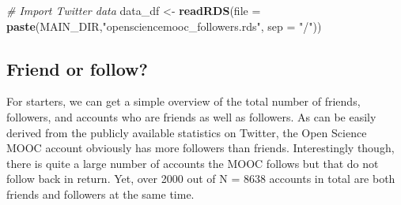 \documentclass[]{article}
\newenvironment{Shaded}{\begin{snugshade}}{\end{snugshade}}
\newcommand{\KeywordTok}[1]{\textcolor[rgb]{0.13,0.29,0.53}{\textbf{#1}}}
\newcommand{\DataTypeTok}[1]{\textcolor[rgb]{0.13,0.29,0.53}{#1}}
\newcommand{\DecValTok}[1]{\textcolor[rgb]{0.00,0.00,0.81}{#1}}
\newcommand{\StringTok}[1]{\textcolor[rgb]{0.31,0.60,0.02}{#1}}
\newcommand{\CommentTok}[1]{\textcolor[rgb]{0.56,0.35,0.01}{\textit{#1}}}
\newcommand{\NormalTok}[1]{#1}
\begin{document}
\begin{Shaded}
\begin{Highlighting}[]
\CommentTok{# Import Twitter data}
\NormalTok{data_df <-}\StringTok{ }\KeywordTok{readRDS}\NormalTok{(}\DataTypeTok{file =} \KeywordTok{paste}\NormalTok{(MAIN_DIR,}\StringTok{"opensciencemooc_followers.rds"}\NormalTok{, }\DataTypeTok{sep =} \StringTok{"/"}\NormalTok{))}
\end{Highlighting}
\end{Shaded}

\begin{Shaded}
\end{Shaded}

\subsection{Friend or follow?}\label{friend-or-follow}

For starters, we can get a simple overview of the total number of
friends, followers, and accounts who are friends as well as followers.
As can be easily derived from the publicly available statistics on
Twitter, the Open Science MOOC account obviously has more followers than
friends. Interestingly though, there is quite a large number of accounts
the MOOC follows but that do not follow back in return. Yet, over 2000
out of N = 8638 accounts in total are both friends and followers at the
same time.
\end{document}
